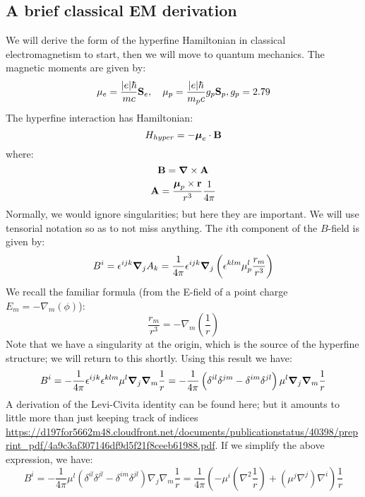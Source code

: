 \subsection{A brief classical EM derivation}
We will derive the form of the hyperfine Hamiltonian in classical electromagnetism to start, then we will move to quantum mechanics. The magnetic moments are given by:
\begin{equation}
    \mu_e = \frac{\lvert e \rvert\hbar}{mc}\mathbf{S}_e, \quad \mu_p = \frac{\lvert e \rvert\hbar}{m_pc}g_p \mathbf{S}_p, g_p = 2.79
\end{equation}
The hyperfine interaction has Hamiltonian:
\begin{equation}
    H_{hyper} = -\mbox{\boldmath$ \mu $}_e\cdot \mathbf{B}
\end{equation}
where:
\begin{equation}
    \v{B} = \nabla \times \v{A}
\end{equation}
\begin{equation}
    \mathbf{A} = \frac{\mbox{\boldmath$ \mu $}_p \times \mathbf{r}}{r^3}\frac{1}{4\pi}
\end{equation}
Normally, we would ignore singularities; but here they are important. We will use tensorial notation so as to not miss anything. The $i$th component of the $B$-field is given by:
\begin{equation}
    B^i = \e^{ijk}\nabla_j A_k = \frac{1}{4\pi}\e^{ijk}\nabla_j\left(\e^{klm}\mu_p^l \frac{r_m}{r^3}\right)
\end{equation}
We recall the familiar formula (from the E-field of a point charge $E_m = -\nabla_m(\phi)$):
\begin{equation}
    \frac{r_m}{r^3} = -\nabla_m\left(\frac{1}{r}\right)
\end{equation}
Note that we have a singularity at the origin, which is the source of the hyperfine structure; we will return to this shortly. Using this result we have:
\begin{equation}
    B^i = -\frac{1}{4\pi}\e^{ijk}\e^{klm}\mu^l \nabla_j \nabla_m \frac{1}{r} = -\frac{1}{4\pi}\left(\delta^{il}\delta^{jm}-\delta^{im}\delta^{jl}\right)\mu^l \nabla_j \nabla_m \frac{1}{r}
\end{equation}
A derivation of the Levi-Civita identity can be found here; but it amounts to little more than just keeping track of indices \url{https://d197for5662m48.cloudfront.net/documents/publicationstatus/40398/preprint_pdf/4a9c3af307146df9d5f21f8ceeb61988.pdf}. If we simplify the above expression, we have:
\begin{equation}
    B^i = -\frac{1}{4\pi}\mu^l\left(\delta^{il}\delta^{jl} - \delta^{im}\delta^{jl}\right)\nabla_j \nabla_m \frac{1}{r} = \frac{1}{4\pi}\left(-\mu^i\left(\nabla^2 \frac{1}{r}\right) + (\mu^j \nabla^j)\nabla^i\right)\frac{1}{r}
\end{equation}
